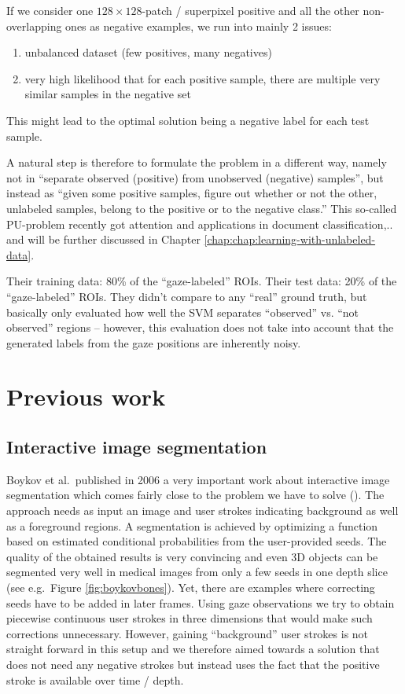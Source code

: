 If we consider one $128 \times 128$-patch / superpixel positive and all the other non-overlapping ones as negative examples, we run into mainly 2 issues: 
\begin{enumerate}
 \item unbalanced dataset (few positives, many negatives)
 \item very high likelihood that for each positive sample, there are multiple very similar samples in the negative set 
\end{enumerate}
This might lead to the optimal solution being a negative label for each test sample.

A natural step is therefore to formulate the problem in a different way, namely not in ``separate observed (positive) from unobserved (negative) samples'', but instead as ``given some positive samples, figure out whether or not the other, unlabeled samples, belong to the positive or to the negative class.''
This so-called PU-problem recently got attention and applications in document classification,..  \cite{elkan2008learning} and will be further discussed in Chapter \ref{chap:chap:learning-with-unlabeled-data}.

Their training data: 80\% of the ``gaze-labeled'' ROIs. Their test data: 20\% of the ``gaze-labeled'' ROIs. They didn't compare to any ``real'' ground truth, but basically only evaluated how well the SVM separates ``observed'' vs. ``not observed'' regions  -- however, this evaluation does not take into account that the generated labels from the gaze positions are inherently noisy.

\section{Previous work}
\subsection{Interactive image segmentation}
Boykov et al.\ published in 2006 a very important work about interactive image segmentation which comes fairly close to the problem we have to solve (\cite{boykov2006graph}). 
The approach needs as input an image and user strokes indicating background as well as a foreground regions. 
A segmentation is achieved by optimizing a function based on estimated conditional probabilities from the user-provided seeds. 
The quality of the obtained results is very convincing and even 3D objects can be segmented very well in medical images from only a few seeds in one depth slice (see e.g.\ Figure \ref{fig:boykovbones}). 
Yet, there are examples where correcting seeds have to be added in later frames. 
Using gaze observations we try to obtain piecewise continuous user strokes in three dimensions that would make such corrections unnecessary. However, gaining ``background'' user strokes is not straight forward in this setup and we therefore aimed towards a solution that does not need any negative strokes but instead uses the fact that the positive stroke is available over time / depth.

